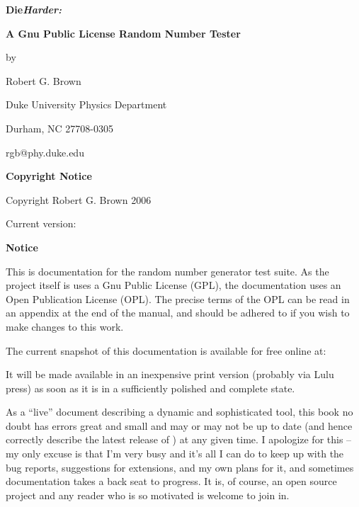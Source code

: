 \documentclass{book}
\begin{document}

%
% 

\pagestyle{empty}
\vsfill

\centerline{\huge \bf Die{\em Harder:}}
\bigskip
\bigskip
\centerline{\Large \bf A Gnu Public License Random Number Tester}

\vsfill
\centerline{\large by}
\bigskip
\centerline{\Large Robert G. Brown}
\bigskip
\centerline{Duke University Physics Department}
\centerline{Durham, NC 27708-0305}
\centerline{rgb@phy.duke.edu}

\vsfill
\blankpage
\vsfill

\centerline{\large \bf Copyright Notice}
\centerline{Copyright Robert G. Brown 2006}
\centerline{Current version: \version}

\blankpage

\centerline{\Large \bf Notice}

This is documentation for the \die random number generator test suite.
As the project itself is uses a Gnu Public License (GPL), the
documentation uses an Open Publication License (OPL).  The precise terms
of the OPL can be read in an appendix at the end of the manual, and
should be adhered to if you wish to make changes to this work.

The current snapshot of this documentation is available for free online
at:

\medskip
 \centerline{}
\medskip 

\noindent It will be made available in an inexpensive print version
(probably via Lulu press) as soon as it is in a sufficiently polished
and complete state.

As a ``live'' document describing a dynamic and sophisticated tool, this
book no doubt has errors great and small and may or may not be up to
date (and hence correctly describe the latest release of \die) at any
given time.  I apologize for this -- my only excuse is that I'm very
busy and it's all I can do to keep up with the bug reports, suggestions
for extensions, and my own plans for it, and sometimes documentation
takes a back seat to progress.  It is, of course, an open source project
and any reader who is so motivated is welcome to join in.
\end{document}
